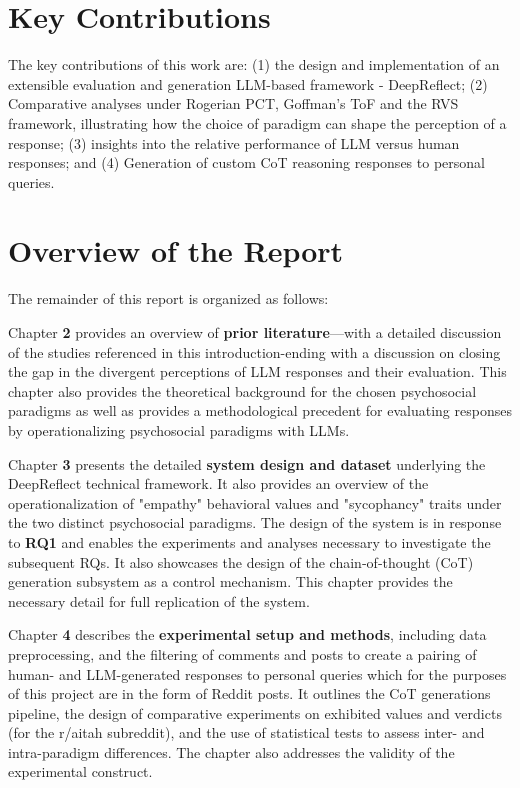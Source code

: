 \section{Key Contributions}
The key contributions of this work are: (1) the design and implementation of an extensible evaluation and generation LLM-based framework - DeepReflect; (2) Comparative analyses under Rogerian PCT, Goffman’s ToF and the RVS framework, illustrating how the choice of paradigm can shape the perception of a response; (3) insights into the relative performance of LLM versus human responses; and (4) Generation of custom CoT reasoning responses to personal queries.

\section{Overview of the Report}

The remainder of this report is organized as follows:

\bigskip Chapter \textbf{2} provides an overview of \textbf{prior literature}—with a detailed discussion of the studies referenced in this introduction-ending with a discussion on closing the gap in the divergent perceptions of LLM responses and their evaluation. This chapter also provides the theoretical background for the chosen psychosocial paradigms as well as provides a methodological precedent for evaluating responses by operationalizing psychosocial paradigms with LLMs.

\bigskip Chapter \textbf{3} presents the detailed \textbf{system design and dataset} underlying the DeepReflect technical framework. It also provides an overview of the operationalization of "empathy" behavioral values and "sycophancy" traits under the two distinct psychosocial paradigms. The design of the system is in response to \textbf{RQ1} and enables the experiments and analyses necessary to investigate the subsequent RQs. It also showcases the design of the chain‑of‑thought (CoT) generation subsystem as a control mechanism. This chapter provides the necessary detail for full replication of the system. 

\bigskip Chapter \textbf{4} describes the \textbf{experimental setup and methods}, including data preprocessing, and the filtering of comments and posts to create a pairing of human- and LLM-generated responses to personal queries which for the purposes of this project are in the form of Reddit posts. It outlines the CoT generations pipeline, the design of comparative experiments on exhibited values and verdicts (for the r/aitah subreddit), and the use of statistical tests to assess inter- and intra-paradigm differences. The chapter also addresses the validity of the experimental construct.

